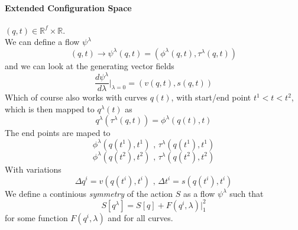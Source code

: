 \documentclass{report}
\begin{document}
\paragraph{Extended Configuration Space}
$\left( q,t \right) \in \mathbb{R}^f \times \mathbb{R}$.\\
We can define a flow $\psi^\lambda$ \[
  \left( q,t \right) \to \psi^\lambda\left( q,t \right) = \left( \phi^\lambda\left( q,t \right) , \tau^\lambda\left( q,t \right)  \right) 
\] and we can look at the generating vector fields \[
\frac{d\psi^\lambda}{d \lambda} |_{\lambda = 0} = \left( v\left( q,t \right) , s\left( q,t \right)  \right) 
\] Which of course also works with curves $q\left( t \right) $, with start/end point $t^1 < t < t^2$, which is then mapped to $q^\lambda\left( t \right) $ as \[
q^\lambda\left( \tau^\lambda\left( q,t \right)  \right) = \phi^\lambda\left( q\left( t \right) , t \right) 
\] The end points are maped to \[
\phi^\lambda\left( q\left( t^1 \right) , t^1 \right) \text{ , } \tau^\lambda\left( q\left( t^1 \right) , t^1 \right) 
\] \[
\phi^\lambda\left( q\left( t^2 \right) , t^2 \right) \text{ , } \tau^\lambda\left( q\left( t^2 \right) , t^2 \right) 
\] 
With variations \[
  \Delta q^i = v\left( q\left( t^i \right) , t^i \right) \text{ , } \Delta t^i = s\left( q\left( t^i \right) , t^i \right) 
\] 
We define a continious \emph{symmetry} of the action $S$ as a flow $\psi^\lambda$ such that \[
  S[q^\lambda] = S[q] + F(q^i, \lambda)|_1^2
\] for some function $F\left( q^i, \lambda \right) $ and for all curves.
\end{document}

